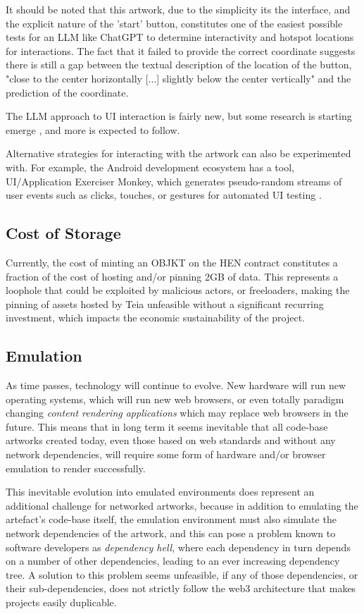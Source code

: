 It should be noted that this artwork, due to the simplicity its the interface, and the explicit nature of the 'start' button, constitutes one of the easiest possible tests for an LLM like ChatGPT to determine interactivity and hotspot locations for interactions. The fact that it failed to provide the correct coordinate suggests there is still a gap between the textual description of the location of the button, "close to the center horizontally [...] slightly below the center vertically" and the prediction of the coordinate.

The LLM approach to UI interaction is fairly new, but some research is starting emerge \cite{liuMakeLLMTesting2024}, and more is expected to follow.

Alternative strategies for interacting with the artwork can also be experimented with. For example, the Android development ecosystem has a tool, UI/Application Exerciser Monkey, which generates pseudo-random streams of user events such as clicks, touches, or gestures for automated UI testing \cite{UIApplicationExerciser}.

\subsection{Cost of Storage}

Currently, the cost of minting an OBJKT on the HEN contract constitutes a fraction of the cost of hosting and/or pinning 2GB of data. This represents a loophole that could be exploited by malicious actors, or freeloaders, making the pinning of assets hosted by Teia unfeasible without a significant recurring investment, which impacts the economic sustainability of the project.

\subsection{Emulation}

As time passes, technology will continue to evolve. New hardware will run new operating systems, which will run new web browsers, or even totally paradigm changing \emph{content rendering applications} which may replace web browsers in the future. This means that in long term it seems inevitable that all code-base artworks created today, even those based on web standards and without any network dependencies, will require some form of hardware and/or browser emulation to render successfully. 

This inevitable evolution into emulated environments does represent an additional challenge for networked artworks, because in addition to emulating the artefact's code-base itself, the emulation environment must also simulate the network dependencies of the artwork, and this can pose a problem known to software developers as \emph{dependency hell}, where each dependency in turn depends on a number of other dependencies, leading to an ever increasing dependency tree. A solution to this problem seems unfeasible, if any of those dependencies, or their sub-dependencies, does not strictly follow the web3 architecture that makes projects easily duplicable.

